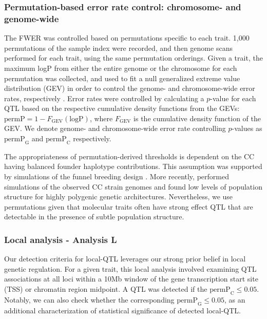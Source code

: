 \documentclass[9pt,twocolumn,twoside]{gsajnl}
\newcommand{\permpc}{\text{permP}_{\text{C}}}
\newcommand{\permpg}{\text{permP}_{\text{G}}}
\newcommand{\GKinline}[1]{\textcolor{teal}{#1}}
\begin{document}
\subsubsection{Permutation-based error rate control: chromosome- and genome-wide}

The FWER was controlled based on permutations specific to each trait. 1,000 permutations of the sample index were recorded, and then genome scans performed for each trait, using the same permutation orderings. Given a trait, the maximum logP from either the entire genome or the chromosome for each permutation was collected, and used to fit a null generalized extreme value distribution (GEV) in order to control the genome- and chromosome-wide error rates, respectively \citep{Dudbridge2004}. 
Error rates were controlled by calculating a $p$-value for each QTL based on the respective cumulative density functions from the GEVs: $\text{permP} = 1 - F_{\text{GEV}}(\text{logP})$, where $F_{\text{GEV}}$ is the cumulative density function of the GEV. We denote genome- and chromosome-wide error rate controlling  $p$-values as $\permpg$ and $\permpc$ respectively.

The appropriateness of permutation-derived thresholds \citep{Doerge1996} is dependent on the CC having balanced founder haplotype contributions. This assumption was supported by simulations of the funnel breeding design \citep{Valdar2006c}. More recently, \cite{Keele2019} performed simulations of the observed CC strain genomes and found low levels of population structure for highly polygenic genetic architectures. Nevertheless, we use permutations given that molecular traits often have strong effect QTL that are detectable in the presence of subtle population structure.

\subsubsection{Local analysis - Analysis L} 
Our detection criteria for local-QTL leverages our strong prior belief in local genetic regulation. For a given trait, this local analysis involved examining QTL associations at all loci within a 10Mb window of the gene transcription start site (TSS) or chromatin region midpoint. A QTL was detected if the $\text{permP}_{\text{C}} \leq 0.05$. Notably, we can also check whether the corresponding $\text{permP}_{\text{G}} \leq 0.05$, as an additional characterization of statistical significance of detected local-QTL.
\end{document}
